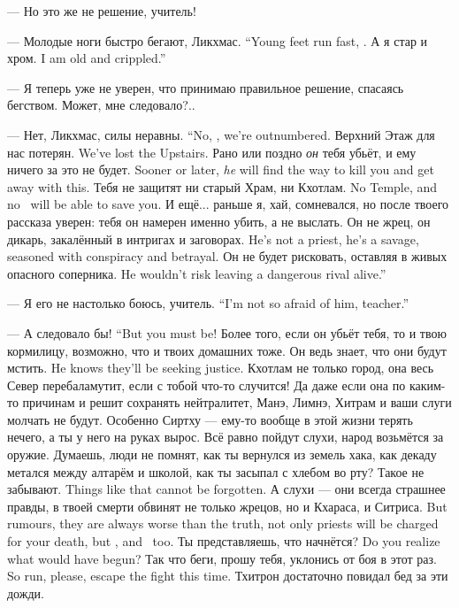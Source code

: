 --- Но это же не решение, учитель!

{--- Молодые ноги быстро бегают, Ликхмас.}
{``Young feet run fast, \Likchmas.}
{А я стар и хром.}
{I am old and crippled.''}

--- Я теперь уже не уверен, что принимаю правильное решение, спасаясь бегством.
Может, мне следовало?..

{--- Нет, Ликхмас, силы неравны.}
{``No, \Likchmas, we're outnumbered.}
{Верхний Этаж для нас потерян.}
{We've lost the Upstairs.}
{Рано или поздно \emph{он} тебя убьёт, и ему ничего за это не будет.}
{Sooner or later, \emph{he} will find the way to kill you and get away with this.}
{Тебя не защитят ни старый Храм, ни Кхотлам.}
{No Temple, and no \Kchotlam\ will be able to save you.}
И ещё... раньше я, хай, сомневался, но после твоего рассказа уверен: тебя он намерен именно убить, а не выслать.
{Он не жрец, он дикарь, закалённый в интригах и заговорах.}
{He's not a priest, he's a savage, seasoned with conspiracy and betrayal.}
{Он не будет рисковать, оставляя в живых опасного соперника.}
{He wouldn't risk leaving a dangerous rival alive.''}

{--- Я его не настолько боюсь, учитель.}
{``I'm not so afraid of him, teacher.''}

{--- А следовало бы!}
{``But you must be!}
Более того, если он убьёт тебя, то и твою кормилицу, возможно, что и твоих домашних тоже.
{Он ведь знает, что они будут мстить.}
{He knows they'll be seeking justice.}
Кхотлам не только город, она весь Север перебаламутит, если с тобой что-то случится!
Да даже если она по каким-то причинам и решит сохранять нейтралитет, Манэ, Лимнэ, Хитрам и ваши слуги молчать не будут.
Особенно Сиртху --- ему-то вообще в этой жизни терять нечего, а ты у него на руках вырос.
Всё равно пойдут слухи, народ возьмётся за оружие.
Думаешь, люди не помнят, как ты вернулся из земель хака, как декаду метался между алтарём и школой, как ты засыпал с хлебом во рту?
{Такое не забывают.}
{Things like that cannot be forgotten.}
{А слухи --- они всегда страшнее правды, в твоей смерти обвинят не только жрецов, но и Кхараса, и Ситриса.}
{But rumours, they are always worse than the truth, not only priests will be charged for your death, but \Kcharas, and \Sitris\ too.}
{Ты представляешь, что начнётся?}
{Do you realize what would have begun?}
{Так что беги, прошу тебя, уклонись от боя в этот раз.}
{So run, please, escape the fight this time.}
Тхитрон достаточно повидал бед за эти дожди.

